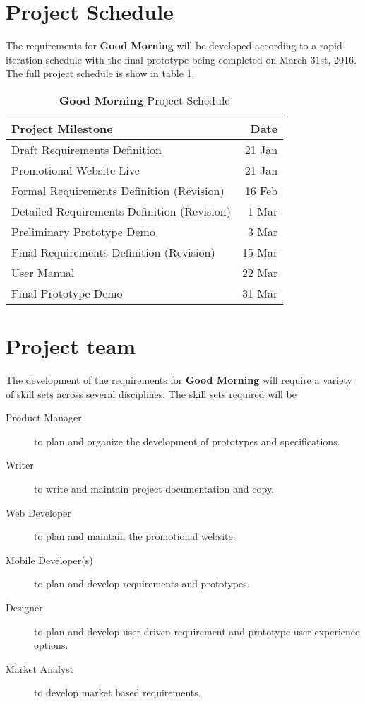 \documentclass[11pt]{article}
\begin{document}

%
\section{Project Schedule}\label{project-schedule}

The requirements for \textbf{Good Morning} will be developed according to a rapid iteration schedule with the final prototype being completed on March 31st, 2016. The full project schedule is show in table \ref{tab:schedule}.

\begin{table}[htb]
    \caption{\textbf{Good Morning} Project Schedule}\label{tab:schedule}
    \centering
    \begin{tabular}{|lr|}
        \hline
        \textbf{Project Milestone} & \textbf{Date} \\
        \hline
        Draft Requirements Definition & 21 Jan \\
        Promotional Website Live & 21 Jan \\
        Formal Requirements Definition (Revision) & 16 Feb \\
        Detailed Requirements Definition (Revision) & 1 Mar \\
        Preliminary Prototype Demo & 3 Mar \\
        Final Requirements Definition (Revision) & 15 Mar \\
        User Manual & 22 Mar \\
        Final Prototype Demo & 31 Mar \\
        \hline
    \end{tabular}
\end{table}



%
\section{Project team}\label{project-team}

The development of the requirements for \textbf{Good Morning} will require a variety of skill sets across several disciplines. The skill sets required will be

\begin{description}
  \item[Product Manager] to plan and organize the development of prototypes and specifications.
  \item[Writer] to write and maintain project documentation and copy.
  \item[Web Developer] to plan and maintain the promotional website.
  \item[Mobile Developer(s)] to plan and develop requirements and prototypes.
  \item[Designer] to plan and develop user driven requirement and prototype user-experience options.
  \item[Market Analyst] to develop market based requirements.
\end{description}
\end{document}
